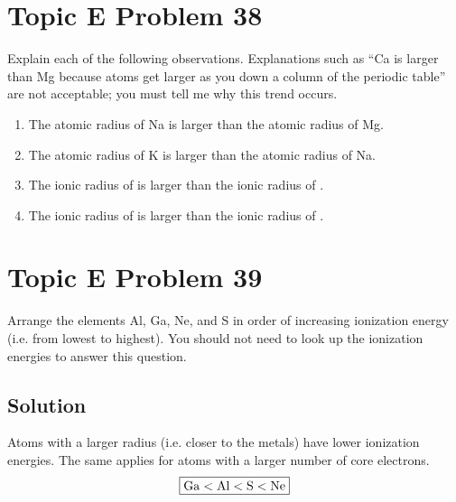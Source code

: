 \documentclass[10pt]{article}
\begin{document}
    \pagebreak
    \section{Topic E Problem 38}
        Explain each of the following observations. 
        Explanations such as “Ca is larger than Mg because atoms get larger as you down a column of the periodic table” are not acceptable; you must tell me why this trend occurs.
        \begin{enumerate}[label=\alph*)]
            \item   The atomic radius of Na is larger than the atomic radius of Mg.
            \item   The atomic radius of K is larger than the atomic radius of Na.
            \item   The ionic radius of  is larger than the ionic radius of .
            \item   The ionic radius of  is larger than the ionic radius of .
        \end{enumerate}
        

    \pagebreak
    \section{Topic E Problem 39}
        Arrange the elements Al, Ga, Ne, and S in order of increasing ionization energy (i.e. from lowest to highest). 
        You should not need to look up the ionization energies to answer this question.

        \subsection{Solution}
            Atoms with a larger radius (i.e. closer to the metals) have lower ionization energies.
            The same applies for atoms with a larger number of core electrons.
            \begin{equation}
                \boxed{\rm Ga < Al < S < Ne}
            \end{equation}


\end{document}
